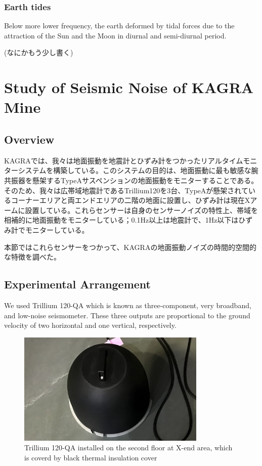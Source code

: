 \subsubsection{Earth tides}
Below more lower frequency, the earth deformed by tidal forces due to the attraction of the Sun and the Moon in diurnal and semi-diurnal period. 

(なにかもう少し書く)


\section{Study of Seismic Noise of KAGRA Mine} \label{sec:33}
\subsection{Overview}
KAGRAでは、我々は地面振動を地震計とひずみ計をつかったリアルタイムモニターシステムを構築している。このシステムの目的は、地面振動に最も敏感な腕共振器を懸架するTypeAサスペンションの地面振動をモニターすることである。そのため、我々は広帯域地震計であるTrillium120を3台、TypeAが懸架されているコーナーエリアと両エンドエリアの二階の地面に設置し、ひずみ計は現在Xアームに設置している。これらセンサーは自身のセンサーノイズの特性上、帯域を相補的に地面振動をモニターしている；0.1Hz以上は地震計で、1Hz以下はひずみ計でモニターしている。

本節ではこれらセンサーをつかって、KAGRAの地面振動ノイズの時間的空間的な特徴を調べた。

\subsection{Experimental Arrangement}\label{sec:331}
We used Trillium 120-QA which is known as three-component, very broadband, and low-noise seismometer. These three outputs are proportional to the ground velocity of two horizontal and one vertical, respectively. 

\begin{figure}[h]
  \begin{center}   
    \includegraphics[width=9.0cm]{./img_chap3/img316.png}
    \caption{Trillium 120-QA installed on the second floor at X-end area, which is coverd by black thermal insulation cover}\label{img:img316}
  \end{center}
\end{figure}

